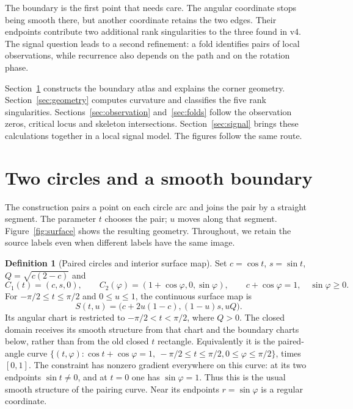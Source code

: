\documentclass[11pt,a4paper]{article}
\theoremstyle{definition}\newtheorem{definition}[theorem]{Definition}
\theoremstyle{remark}\newtheorem{remark}[theorem]{Remark}
\begin{document}
The boundary is the first point that needs care. The angular coordinate
stops being smooth there, but another coordinate retains the two edges.
Their endpoints contribute two additional rank singularities to the
three found in v4. The signal question leads to a second refinement:
a fold identifies pairs of local observations, while recurrence also
depends on the path and on the rotation phase.

Section~\ref{sec:domain} constructs the boundary atlas and explains the
corner geometry. Section~\ref{sec:geometry} computes curvature and
classifies the five rank singularities. Sections~\ref{sec:observation}
and~\ref{sec:folds} follow the observation zeros, critical locus and
skeleton intersections. Section~\ref{sec:signal} brings these calculations
together in a local signal model. The figures follow the same route.

\section{Two circles and a smooth boundary}\label{sec:domain}
The construction pairs a point on each circle arc and joins the pair by a
straight segment. The parameter $t$ chooses the pair; $u$ moves along that
segment. Figure~\ref{fig:surface} shows the resulting geometry. Throughout,
we retain the source labels even when different labels have the same image.

\begin{definition}[Paired circles and interior surface map]\label{def:surface}
Set $c=\cos t$, $s=\sin t$, $Q=\sqrt{c(2-c)}$ and
\[
 C_1(t)=(c,s,0),\qquad C_2(\varphi)=(1+\cos\varphi,0,\sin\varphi),
 \qquad c+\cos\varphi=1,\quad \sin\varphi\geq0.
\]
For $-\pi/2\leq t\leq\pi/2$ and $0\leq u\leq1$, the continuous surface
map is
\begin{equation}\label{eq:surface}
 S(t,u)=\big(c+2u(1-c),(1-u)s,uQ\big).
\end{equation}
Its angular chart is restricted to $-\pi/2<t<\pi/2$, where $Q>0$.
The closed domain receives its smooth structure from that chart and the
boundary charts below, rather than from the old closed $t$ rectangle.
Equivalently it is the paired-angle curve
$\{(t,\varphi):\cos t+\cos\varphi=1,\ -\pi/2\leq t\leq\pi/2,
0\leq\varphi\leq\pi/2\}$, times $[0,1]$.
The constraint has nonzero gradient everywhere on this curve:
at its two endpoints $\sin t\ne0$, and at $t=0$ one has
$\sin\varphi=1$. Thus this is the usual smooth structure of the pairing
curve. Near its endpoints $r=\sin\varphi$ is a regular coordinate.
\end{definition}
\end{document}

